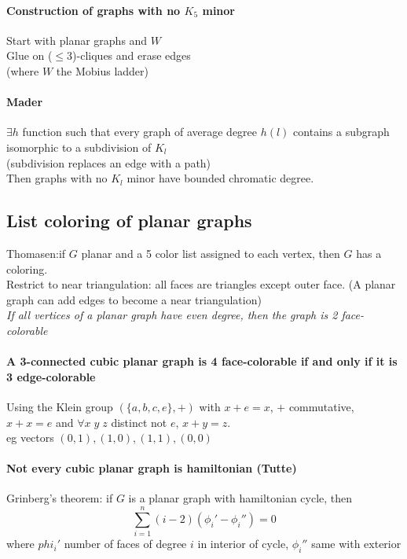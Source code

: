 \documentclass[12pt]{article}
\begin{document}
\paragraph{Construction of graphs with no $K_5$ minor\\}
Start with planar graphs and $W$\\
Glue on ($\leqslant 3$)-cliques and erase edges\\
(where $W$ the Mobius ladder)\\

\paragraph{Mader} $\exists h$ function such that every graph of average degree $h(l)$ contains a subgraph isomorphic to a subdivision of $K_l$\\
(subdivision replaces an edge with a path)\\
Then graphs with no $K_l$ minor have bounded chromatic degree.\\

\subsection{List coloring of planar graphs\\}
Thomasen:if $G$ planar and a 5 color list assigned to each vertex, then $G$ has a coloring.\\
Restrict to near triangulation: all faces are triangles except outer face. (A planar graph can add edges to become a near triangulation)\\

\emph{If all vertices of a planar graph have even degree, then the graph is 2 face-colorable\\}

\paragraph{A 3-connected cubic planar graph is 4 face-colorable if and only if it is 3 edge-colorable\\}
Using the Klein group $(\{a,b,c,e\}, +)$ with $x+e = x$, $+$ commutative, $x+x=e$ and $\forall x \; y \; z$ distinct not $e$, $x+y=z$.\\
eg vectors $(0,1),(1,0),(1,1),(0,0)$\\

\paragraph{Not every  cubic planar graph is hamiltonian (Tutte)\\}
Grinberg's theorem: if $G$ is a planar graph with hamiltonian cycle, then
\[ \sum_{i=1}^n (i-2) (\phi_i' - \phi_i'') = 0 \]
where $phi_i'$ number of faces of degree $i$ in interior of cycle, $\phi_i''$ same with exterior\\
\end{document}
